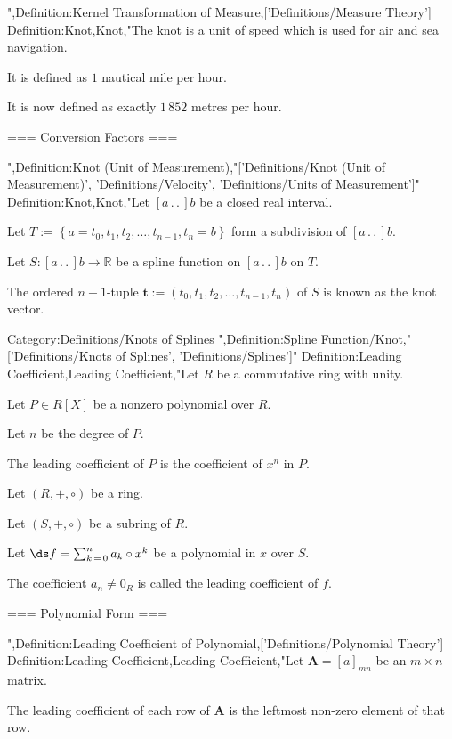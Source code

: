 ",Definition:Kernel Transformation of Measure,['Definitions/Measure Theory']
Definition:Knot,Knot,"The knot is a unit of speed which is used for air and sea navigation.

It is defined as $1$ nautical mile per hour.

It is now defined as exactly $1 \, 852$ metres per hour.


=== Conversion Factors ===

",Definition:Knot (Unit of Measurement),"['Definitions/Knot (Unit of Measurement)', 'Definitions/Velocity', 'Definitions/Units of Measurement']"
Definition:Knot,Knot,"Let $\left[ a \,.\,.\,   \right]b$ be a closed real interval.

Let $T := \left\lbrace a = t_0, t_1, t_2, \ldots, t_{n - 1}, t_n = b \right\rbrace$ form a subdivision of $\left[ a \,.\,.\,   \right]b$.

Let $S: \left[ a \,.\,.\,   \right]b \to \mathbb R$ be a spline function on $\left[ a \,.\,.\,   \right]b$ on $T$.


The ordered $n + 1$-tuple $\mathbf t := \left( t_0, t_1, t_2, \ldots, t_{n - 1}, t_n \right)$ of $S$ is known as the knot vector.


Category:Definitions/Knots of Splines
",Definition:Spline Function/Knot,"['Definitions/Knots of Splines', 'Definitions/Splines']"
Definition:Leading Coefficient,Leading Coefficient,"Let $R$ be a commutative ring with unity.

Let $P \in R \left[ X \right]$ be a nonzero polynomial over $R$.

Let $n$ be the degree of $P$.


The leading coefficient of $P$ is the coefficient of $x^n$ in $P$.



Let $\left( R, +, \circ \right)$ be a ring.

Let $\left( S, +, \circ \right)$ be a subring of $R$.

Let $\ds f = \sum_{k \mathop = 0}^n a_k \circ x^k$ be a polynomial in $x$ over $S$.


The coefficient $a_n \ne 0_R$ is called the leading coefficient of $f$.


=== Polynomial Form ===

",Definition:Leading Coefficient of Polynomial,['Definitions/Polynomial Theory']
Definition:Leading Coefficient,Leading Coefficient,"Let $\mathbf A = \left[ a \right]_{m n}$ be an $m \times n$ matrix.

The leading coefficient of each row of $\mathbf A$ is the leftmost non-zero element of that row.


